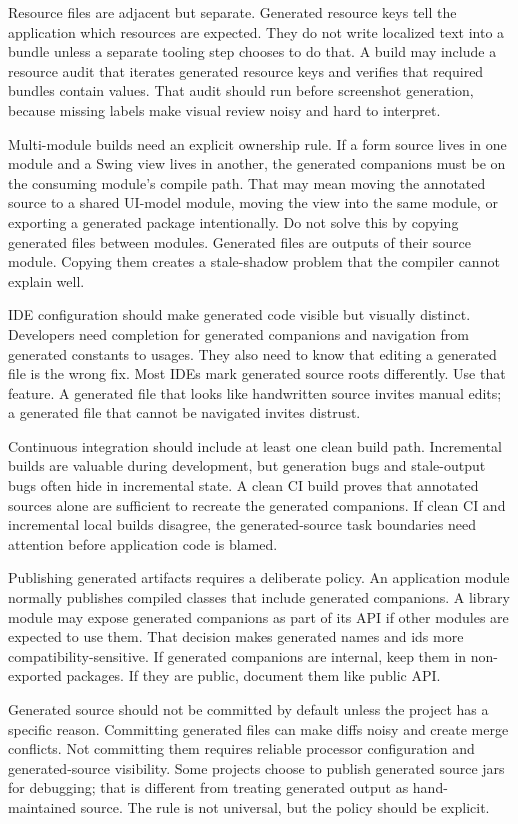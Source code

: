 Resource files are adjacent but separate. Generated resource keys tell the
application which resources are expected. They do not write localized text
into a bundle unless a separate tooling step chooses to do that. A build may
include a resource audit that iterates generated resource keys and verifies
that required bundles contain values. That audit should run before screenshot
generation, because missing labels make visual review noisy and hard to
interpret.

Multi-module builds need an explicit ownership rule. If a form source lives in
one module and a Swing view lives in another, the generated companions must be
on the consuming module's compile path. That may mean moving the annotated
source to a shared UI-model module, moving the view into the same module, or
exporting a generated package intentionally. Do not solve this by copying
generated files between modules. Generated files are outputs of their source
module. Copying them creates a stale-shadow problem that the compiler cannot
explain well.

IDE configuration should make generated code visible but visually distinct.
Developers need completion for generated companions and navigation from
generated constants to usages. They also need to know that editing a generated
file is the wrong fix. Most IDEs mark generated source roots differently. Use
that feature. A generated file that looks like handwritten source invites
manual edits; a generated file that cannot be navigated invites distrust.

Continuous integration should include at least one clean build path. Incremental
builds are valuable during development, but generation bugs and stale-output
bugs often hide in incremental state. A clean CI build proves that annotated
sources alone are sufficient to recreate the generated companions. If clean CI
and incremental local builds disagree, the generated-source task boundaries
need attention before application code is blamed.

Publishing generated artifacts requires a deliberate policy. An application
module normally publishes compiled classes that include generated companions.
A library module may expose generated companions as part of its API if other
modules are expected to use them. That decision makes generated names and ids
more compatibility-sensitive. If generated companions are internal, keep them
in non-exported packages. If they are public, document them like public API.

Generated source should not be committed by default unless the project has a
specific reason. Committing generated files can make diffs noisy and create
merge conflicts. Not committing them requires reliable processor configuration
and generated-source visibility. Some projects choose to publish generated
source jars for debugging; that is different from treating generated output as
hand-maintained source. The rule is not universal, but the policy should be
explicit.


